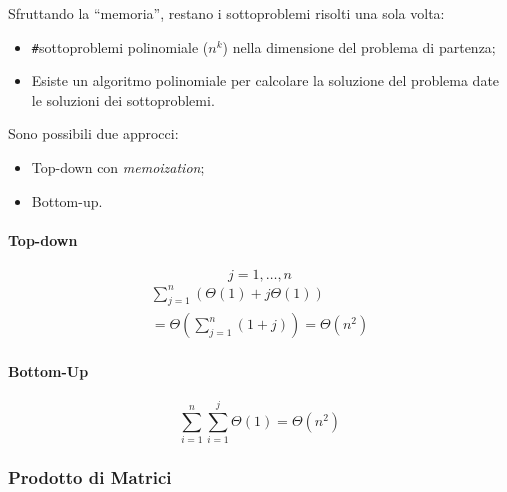 Sfruttando la ``memoria'', restano i sottoproblemi risolti una sola volta:
\begin{center}
\end{center}

\begin{itemize}
    \item \verb|#|sottoproblemi polinomiale ($n^k$) nella dimensione del problema di partenza;
    \item Esiste un algoritmo polinomiale per calcolare la soluzione del problema date le soluzioni dei sottoproblemi.
\end{itemize}

Sono possibili due approcci: 
\begin{itemize}
    \item Top-down con \emph{memoization};
    \item Bottom-up.
\end{itemize}

\paragraph{Top-down}



$$j = 1, \ldots, n$$
\begin{gather*}
    \displaystyle\sum_{j=1}^{n} \left( \Theta(1) + j \Theta(1) \right) \\
    = \Theta \left( \displaystyle\sum_{j=1}^{n} (1+j) \right) = \Theta(n^2)
\end{gather*}

\paragraph{Bottom-Up}


$$\displaystyle\sum_{i=1}^n \displaystyle\sum_{i=1}^j \Theta(1) = \Theta (n^2)$$

\subsubsection{Prodotto di Matrici}

